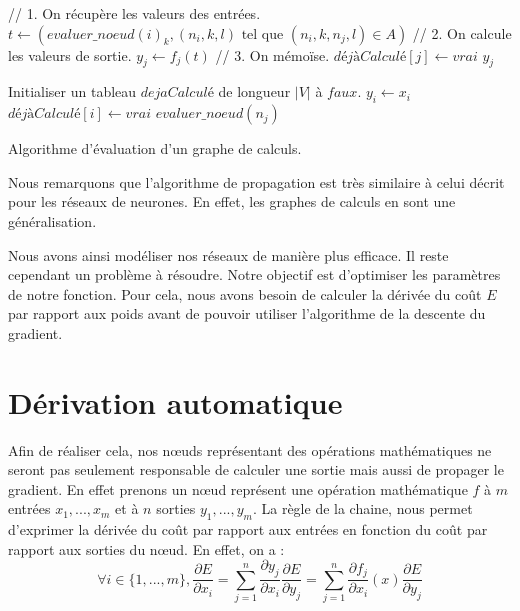 \begin{algorithm} 
\begin{algorithmic}
		\State // 1. On récupère les valeurs des entrées.
		\State $t \leftarrow (evaluer\_noeud(i)_k, (n_i, k, l)\text{ tel que }(n_i, k, n_j, l) \in A)$
		\State // 2. On calcule les valeurs de sortie.
		\State $y_j \leftarrow f_j(t)$
		\State // 3. On mémoïse.
		\State $déjàCalculé[j] \leftarrow vrai$
	\EndIf
	\State \Return $y_j$
\EndFunction

\State Initialiser un tableau $dejaCalculé$ de longueur $|V|$ à $faux$.
	\State $y_i \leftarrow x_i$
	\State $déjàCalculé[i] \leftarrow vrai$ 
\EndFor
{}
	\State $evaluer\_noeud(n_j)$ 
\EndFor
\EndProcedure
\end{algorithmic}
\caption{Algorithme d'évaluation d'un graphe de calculs.}
\label{propagation_memoisation}
\end{algorithm}

Nous remarquons que l'algorithme de propagation est très similaire à celui décrit pour les réseaux de neurones. En effet, les graphes de calculs en sont une généralisation.

Nous avons ainsi modéliser nos réseaux de manière plus efficace. Il reste cependant un problème à résoudre. Notre objectif est d'optimiser les paramètres de notre fonction. Pour cela, nous avons besoin de calculer la dérivée du coût $E$ par rapport aux poids avant de pouvoir utiliser l'algorithme de la descente du gradient.

\section{Dérivation automatique}

Afin de réaliser cela, nos n\oe{}uds représentant des opérations mathématiques ne seront pas seulement responsable de calculer une sortie mais aussi de propager le gradient. En effet prenons un n\oe{}ud représent une opération mathématique $f$ à $m$ entrées $x_1, ..., x_m$ et à $n$ sorties $y_1, ..., y_m$. La règle de la chaine, nous permet d'exprimer la dérivée du coût par rapport aux entrées en fonction du coût par rapport aux sorties du n\oe{}ud. En effet, on a :
\begin{equation}
\forall i \in \{1, ...,  m\}, \frac{\partial E}{\partial x_i} = \sum_{j=1}^{n}{\frac{\partial y_j}{\partial x_i}\frac{\partial E}{\partial y_j}} = \sum_{j=1}^{n}{\frac{\partial f_j}{\partial x_i}(x)\frac{\partial E}{\partial y_j}}
\label{retropropagation_graphe}
\end{equation}

